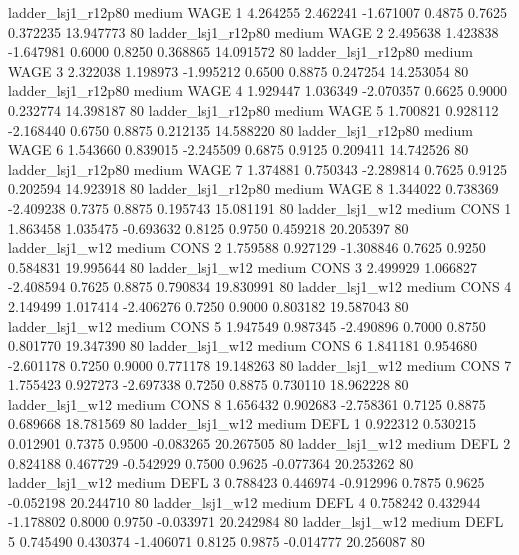     ladder_lsj1_r12p80     medium     WAGE                 1  4.264255 2.462241 -1.671007 0.4875 0.7625  0.372235   13.947773 80
    ladder_lsj1_r12p80     medium     WAGE                 2  2.495638 1.423838 -1.647981 0.6000 0.8250  0.368865   14.091572 80
    ladder_lsj1_r12p80     medium     WAGE                 3  2.322038 1.198973 -1.995212 0.6500 0.8875  0.247254   14.253054 80
    ladder_lsj1_r12p80     medium     WAGE                 4  1.929447 1.036349 -2.070357 0.6625 0.9000  0.232774   14.398187 80
    ladder_lsj1_r12p80     medium     WAGE                 5  1.700821 0.928112 -2.168440 0.6750 0.8875  0.212135   14.588220 80
    ladder_lsj1_r12p80     medium     WAGE                 6  1.543660 0.839015 -2.245509 0.6875 0.9125  0.209411   14.742526 80
    ladder_lsj1_r12p80     medium     WAGE                 7  1.374881 0.750343 -2.289814 0.7625 0.9125  0.202594   14.923918 80
    ladder_lsj1_r12p80     medium     WAGE                 8  1.344022 0.738369 -2.409238 0.7375 0.8875  0.195743   15.081191 80
       ladder_lsj1_w12     medium     CONS                 1  1.863458 1.035475 -0.693632 0.8125 0.9750  0.459218   20.205397 80
       ladder_lsj1_w12     medium     CONS                 2  1.759588 0.927129 -1.308846 0.7625 0.9250  0.584831   19.995644 80
       ladder_lsj1_w12     medium     CONS                 3  2.499929 1.066827 -2.408594 0.7625 0.8875  0.790834   19.830991 80
       ladder_lsj1_w12     medium     CONS                 4  2.149499 1.017414 -2.406276 0.7250 0.9000  0.803182   19.587043 80
       ladder_lsj1_w12     medium     CONS                 5  1.947549 0.987345 -2.490896 0.7000 0.8750  0.801770   19.347390 80
       ladder_lsj1_w12     medium     CONS                 6  1.841181 0.954680 -2.601178 0.7250 0.9000  0.771178   19.148263 80
       ladder_lsj1_w12     medium     CONS                 7  1.755423 0.927273 -2.697338 0.7250 0.8875  0.730110   18.962228 80
       ladder_lsj1_w12     medium     CONS                 8  1.656432 0.902683 -2.758361 0.7125 0.8875  0.689668   18.781569 80
       ladder_lsj1_w12     medium     DEFL                 1  0.922312 0.530215  0.012901 0.7375 0.9500 -0.083265   20.267505 80
       ladder_lsj1_w12     medium     DEFL                 2  0.824188 0.467729 -0.542929 0.7500 0.9625 -0.077364   20.253262 80
       ladder_lsj1_w12     medium     DEFL                 3  0.788423 0.446974 -0.912996 0.7875 0.9625 -0.052198   20.244710 80
       ladder_lsj1_w12     medium     DEFL                 4  0.758242 0.432944 -1.178802 0.8000 0.9750 -0.033971   20.242984 80
       ladder_lsj1_w12     medium     DEFL                 5  0.745490 0.430374 -1.406071 0.8125 0.9875 -0.014777   20.256087 80
